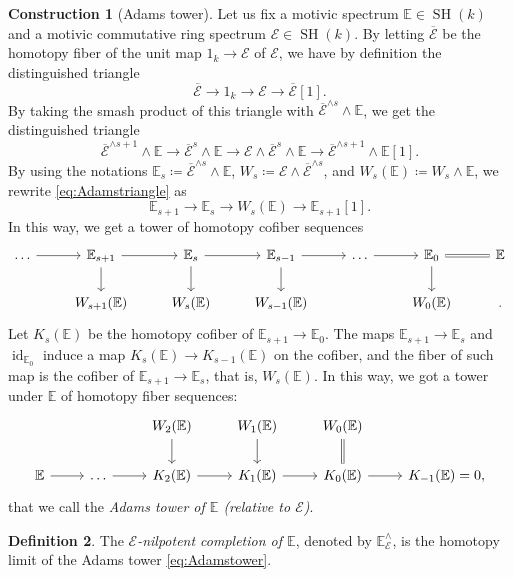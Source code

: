 \documentclass[10pt]{amsart}
\theoremstyle{definition}
\newtheorem{defn}{Definition}[section]
\newtheorem{constr}[defn]{Construction}
\theoremstyle{plain}
\numberwithin{equation}{section}
\newcommand{\0}{\emptyset}
\newcommand{\sE}{{\mathcal E}}
\newcommand{\E}{{\mathbb E}}
\newcommand{\SH}{{\operatorname{SH}}}
\newcommand{\id}{{\operatorname{id}}}
\begin{document}
\begin{constr}[Adams tower]
    Let us fix a motivic spectrum $\E \in \SH(k)$ and a motivic commutative ring spectrum $\sE \in \SH(k)$. By letting $\overline{\sE}$ be the homotopy fiber of the unit map $1_k \to \sE$ of $\sE$, we have by definition the distinguished triangle 
    $$\overline{\sE} \to 1_k \to \sE \to \overline{\sE}[1].$$
    By taking the smash product of this triangle with $\overline{\sE}^{\wedge s} \wedge \E$, we get the distinguished triangle
    \begin{equation}
    \label{eq:Adamstriangle}
        \overline{\sE}^{\wedge s+1} \wedge \E \to \overline{\sE}^s \wedge \E \to \sE \wedge \overline{\sE}^s \wedge \E \to \overline{\sE}^{\wedge s+1} \wedge \E[1].
    \end{equation}
    By using the notations $\E_s \coloneqq \overline{\sE}^{\wedge s} \wedge \E$, $W_s \coloneqq \sE \wedge \overline{\sE}^{\wedge s}$, and $W_s(\E) \coloneqq W_s \wedge \E$, we rewrite \eqref{eq:Adamstriangle} as
    $$\E_{s+1} \to \E_s \to W_s(\E) \to \E_{s+1}[1].$$
    In this way, we get a tower of homotopy cofiber sequences
    $$
    \begin{tikzcd}
        \ldots \arrow[r] & \E_{s+1} \arrow[d] \arrow[r] & \E_s \arrow[d] \arrow[r] & \E_{s-1} \arrow[d] \arrow[r] & \ldots \arrow[r] & \E_0 \arrow[d] \arrow[r, equal] & \E \\
        & W_{s+1}(\E) & W_s(\E) & W_{s-1}(\E) & & W_0(\E) & .
    \end{tikzcd}
    $$
    Let $K_s(\E)$ be the homotopy cofiber of $\E_{s+1}\to \E_0$. The maps $\E_{s+1}\to \E_s$ and $\id_{\E_0}$ induce a map $K_s(\E) \to K_{s-1}(\E)$ on the cofiber, and the fiber of such map is the cofiber of $\E_{s+1} \to \E_s$, that is, $W_s(\E)$. In this way, we got a tower  under $\E$ of homotopy fiber sequences:
    \begin{equation}
    \label{eq:Adamstower}
         \begin{tikzcd}
        & & W_2(\E) \arrow[d] & W_1(\E) \arrow[d] & W_0(\E) \arrow[d, equal] \\
        \E \arrow[r] &\ldots \arrow[r] & K_2(\E) \arrow[r] & K_1(\E) \arrow[r] & K_0(\E) \arrow[r] & K_{-1}(\E)=0,
    \end{tikzcd}
    \end{equation}
    that we call the \emph{Adams tower of $\E$ (relative to $\sE$)}.
\end{constr}

\begin{defn}
    The \emph{$\sE$-nilpotent completion of $\E$}, denoted by $\E^{\wedge}_{\sE}$, is the homotopy limit of the Adams tower \eqref{eq:Adamstower}. 
\end{defn}
\end{document}
